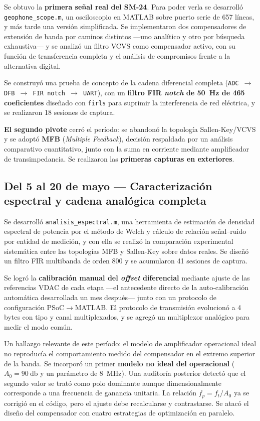 Se obtuvo la \textbf{primera se\~nal real del SM-24}. Para poder verla se desarroll\'o
\texttt{geophone\_scope.m}, un osciloscopio en MATLAB sobre puerto serie de 657 l\'ineas,
y m\'as tarde una versi\'on simplificada. Se implementaron dos compensadores de extensi\'on
de banda por caminos distintos ---uno anal\'itico y otro por b\'usqueda exhaustiva--- y se
analiz\'o un filtro VCVS como compensador activo, con su funci\'on de transferencia completa
y el an\'alisis de compromisos frente a la alternativa digital.

Se construy\'o una prueba de concepto de la cadena diferencial completa
(\texttt{ADC $\to$ DFB $\to$ FIR notch $\to$ UART}), con un \textbf{filtro FIR
\emph{notch} de \SI{50}{\hertz} de 465 coeficientes} dise\~nado con \texttt{firls} para
suprimir la interferencia de red el\'ectrica, y se realizaron 18 sesiones de captura.

\textbf{El segundo pivote} cerr\'o el per\'iodo: se abandon\'o la topolog\'ia Sallen-Key/VCVS y
se adopt\'o \textbf{MFB} (\emph{Multiple Feedback}), decisi\'on respaldada por un an\'alisis
comparativo cuantitativo, junto con la suma en corriente mediante amplificador de
transimpedancia. Se realizaron las \textbf{primeras capturas en exteriores}.

\subsection{Del 5 al 20 de mayo --- Caracterizaci\'on espectral y cadena anal\'ogica completa}

Se desarroll\'o \texttt{analisis\_espectral.m}, una herramienta de estimaci\'on de densidad
espectral de potencia por el m\'etodo de Welch y c\'alculo de relaci\'on se\~nal--ruido por
entidad de medici\'on, y con ella se realiz\'o la comparaci\'on experimental sistem\'atica
entre las topolog\'ias MFB y Sallen-Key sobre datos reales. Se dise\~n\'o un filtro FIR
multibanda de orden 800 y se acumularon 41 sesiones de captura.

Se logr\'o la \textbf{calibraci\'on manual del \emph{offset} diferencial} mediante ajuste de
las referencias VDAC de cada etapa ---el antecedente directo de la auto-calibraci\'on
autom\'atica desarrollada un mes despu\'es--- junto con un protocolo de configuraci\'on
PSoC$\to$MATLAB. El protocolo de transmisi\'on evolucion\'o a 4 bytes con tipo y canal
multiplexados, y se agreg\'o un multiplexor anal\'ogico para medir el modo com\'un.

Un hallazgo relevante de este per\'iodo: el modelo de amplificador operacional ideal no
reproduc\'ia el comportamiento medido del compensador en el extremo superior de la banda.
Se incorpor\'o un primer \textbf{modelo no ideal del operacional} ($A_0=\SI{90}{\decibel}$
y un par\'ametro de \SI{8}{\mega\hertz}). Una auditor\'ia posterior detect\'o que el
segundo valor se trat\'o como polo dominante aunque dimensionalmente corresponde a una
frecuencia de ganancia unitaria. La relaci\'on $f_p=f_t/A_0$ ya se corrigi\'o en el c\'odigo,
pero el ajuste debe recalcularse y contrastarse. Se atac\'o el dise\~no del
compensador con cuatro estrategias de optimizaci\'on en paralelo.

